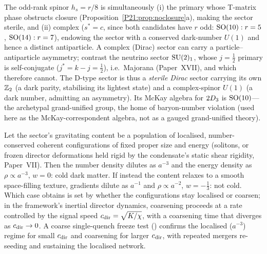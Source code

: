 \begin{proposition}
\label{P21:prop:sterile_dirac}
The odd-rank spinor $h_s=r/8$ is simultaneously (i) the primary whose
T-matrix phase obstructs closure (Proposition~\ref{P21:prop:noclosure}a),
making the sector sterile, and (ii) complex ($s^{*}=c$, since both
candidates have $r$ odd: $\mathrm{SO}(10):r=5$, $\mathrm{SO}(14):r=7$), endowing the
sector with a conserved dark-number $U(1)$ and hence a distinct
antiparticle. A complex (Dirac) sector can carry a particle--antiparticle
asymmetry; contrast the neutrino sector $\mathrm{SU}(2)_1$, whose $j=\tfrac12$
primary is self-conjugate ($j^{*}=k-j=\tfrac12$), i.e.\ Majorana
(Paper~XVII), and which therefore cannot. The D-type sector is thus a
\emph{sterile Dirac} sector carrying its own $\mathbb{Z}_2$ (a dark parity,
stabilising its lightest state) and a complex-spinor $U(1)$ (a dark
number, admitting an asymmetry). Its McKay algebra for $2D_3$ is
$\mathrm{SO}(10)$---the archetypal grand-unified group, the home of
baryon-number violation (used here as the McKay-correspondent algebra,
not as a gauged grand-unified theory).
\end{proposition}

\begin{proposition}
\label{P21:prop:eos}
Let the sector's gravitating content be a population of localised,
number-conserved coherent configurations of fixed proper size and energy
(solitons, or frozen director deformations held rigid by the condensate's
static shear rigidity, Paper~VII). Then the number density dilutes as
$a^{-3}$ and the energy density as $\rho\propto a^{-3}$, $w=0$: cold
dark matter. If instead the content relaxes to a smooth space-filling
texture, gradients dilute as $a^{-1}$ and $\rho\propto a^{-2}$,
$w=-\tfrac13$: not cold. Which case obtains is set by whether the
configurations stay localised or coarsen; in the framework's inertial
director dynamics, coarsening proceeds at a rate controlled by the
signal speed $c_{\mathrm{dir}}=\sqrt{K/\chi}$, with a coarsening time that diverges
as $c_{\mathrm{dir}}\to0$. A coarse single-quench freeze test
() confirms
the localised ($a^{-3}$) regime for small $c_{\mathrm{dir}}$ and coarsening for
larger $c_{\mathrm{dir}}$, with repeated mergers re-seeding and sustaining the
localised network.
\end{proposition}

